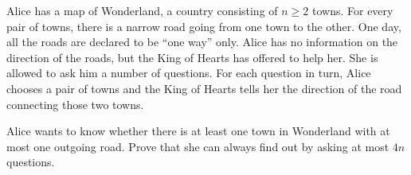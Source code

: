 Alice has a map of Wonderland, a country consisting of $n \geq 2$ towns. For every pair of towns, there is a narrow road going from one town to the other. One day, all the roads are declared to be “one way” only. Alice has no information on the direction of the roads, but the King of Hearts has offered to help her. She is allowed to ask him a number of questions. For each question in turn, Alice chooses a pair of towns and the King of Hearts tells her the direction of the road connecting those two towns.

Alice wants to know whether there is at least one town in Wonderland with at most one outgoing road. Prove that she can always find out by asking at most $4n$ questions.